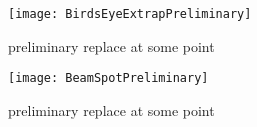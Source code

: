 \begin{figure}[]
	\caption[Birds Eye View of Extrapolation]{preliminary replace at some point}	
	\centering
	\texttt{[image: BirdsEyeExtrapPreliminary]}
	\label{fig:BirdsEyeExtrapPreliminary}
\end{figure}

\begin{figure}[]
	\caption[Beam spot extrapolation]{preliminary replace at some point}	
	\centering
	\texttt{[image: BeamSpotPreliminary]}
	\label{fig:BeamSpotPreliminary}
\end{figure}


